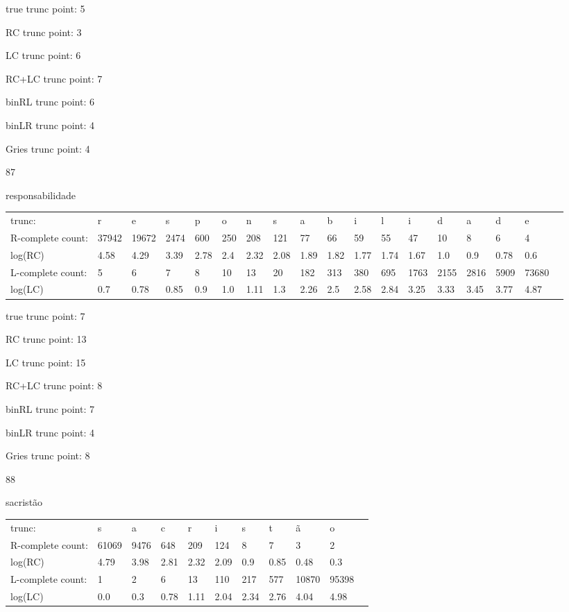 \documentclass[10pt]{article}
\begin{document}
true trunc point: 5

RC trunc point: 3

LC trunc point: 6

RC+LC trunc point: 7

binRL trunc point: 6

binLR trunc point: 4

Gries trunc point: 4

\vspace{1em}

87

responsabilidade

\begin{tabular}{l|lllllllllllllllll}
trunc: & r & e & s & p & o & n & s & a & b & i & l & i & d & a & d & e & \\ 
R-complete count: & 37942 & 19672 & 2474 & 600 & 250 & 208 & 121 & 77 & 66 & 59 & 55 & 47 & 10 & 8 & 6 & 4 & \\ 
log(RC) & 4.58 & 4.29 & 3.39 & 2.78 & 2.4 & 2.32 & 2.08 & 1.89 & 1.82 & 1.77 & 1.74 & 1.67 & 1.0 & 0.9 & 0.78 & 0.6 & \\ 
L-complete count: & 5 & 6 & 7 & 8 & 10 & 13 & 20 & 182 & 313 & 380 & 695 & 1763 & 2155 & 2816 & 5909 & 73680 & \\ 
log(LC) & 0.7 & 0.78 & 0.85 & 0.9 & 1.0 & 1.11 & 1.3 & 2.26 & 2.5 & 2.58 & 2.84 & 3.25 & 3.33 & 3.45 & 3.77 & 4.87 & \\ 
\end{tabular}

true trunc point: 7

RC trunc point: 13

LC trunc point: 15

RC+LC trunc point: 8

binRL trunc point: 7

binLR trunc point: 4

Gries trunc point: 8

\vspace{1em}

88

sacristão

\begin{tabular}{l|llllllllll}
trunc: & s & a & c & r & i & s & t & ã & o & \\ 
R-complete count: & 61069 & 9476 & 648 & 209 & 124 & 8 & 7 & 3 & 2 & \\ 
log(RC) & 4.79 & 3.98 & 2.81 & 2.32 & 2.09 & 0.9 & 0.85 & 0.48 & 0.3 & \\ 
L-complete count: & 1 & 2 & 6 & 13 & 110 & 217 & 577 & 10870 & 95398 & \\ 
log(LC) & 0.0 & 0.3 & 0.78 & 1.11 & 2.04 & 2.34 & 2.76 & 4.04 & 4.98 & \\ 
\end{tabular}
\end{document}
